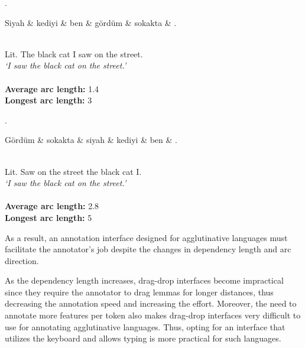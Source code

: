 \begin{multicols}{2}
\vspace*{\fill} 
\ex. \label{dep1}
\begin{dependency}
   \begin{deptext}
      Siyah \& kediyi \& ben \& gördüm \& sokakta \& . \\
   \end{deptext}
\end{dependency} \\
Lit. The black cat I saw on the street. \\
\textit{‘I saw the black cat on the street.’} \\
\vspace{.05cm} \\
\textbf{Average arc length:} 1.4\\
\textbf{Longest arc length:} 3\\
\columnbreak

\ex. \label{dep2}
\begin{dependency}
   \begin{deptext}
      Gördüm \& sokakta \& siyah \& kediyi \& ben \& . \\
   \end{deptext}
\end{dependency} \\
Lit. Saw on the street the black cat I. \\
\textit{‘I saw the black cat on the street.’} \\
\vspace{.05cm} \\
\textbf{Average arc length:} 2.8\\
\textbf{Longest arc length:} 5

\end{multicols}

As a result, an annotation interface designed for agglutinative languages must facilitate the annotator's job despite the changes in dependency length and arc direction.

As the dependency length increases, drag-drop interfaces become impractical since they require the annotator to drag lemmas for longer distances, thus decreasing the annotation speed and increasing the effort.
Moreover, the need to annotate more features per token also makes drag-drop interfaces very difficult to use for annotating agglutinative languages.
Thus, opting for an interface that utilizes the keyboard and allows typing is more practical for such languages.

